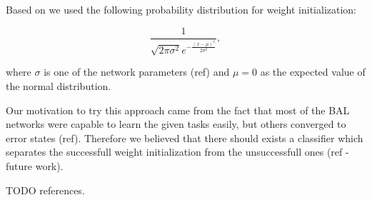 Based on \citet{o1996bio} we used the following probability distribution for weight initialization: 

\begin{equation} 
\frac{1}{\sqrt{2\pi \sigma^2} e^{-\frac{(x-\mu)^2}{2\sigma^2}}},
\end{equation} 

where $\sigma$ is one of the network parameters (ref) and $\mu = 0$ as the expected value of the normal distribution. 

Our motivation to try this approach came from the fact that most of the BAL networks were capable to learn the given tasks easily, but others converged to error states (ref). Therefore we believed that there should exists a classifier which separates the successfull weight initialization from the unsuccessfull ones (ref - future work). 

TODO references.

